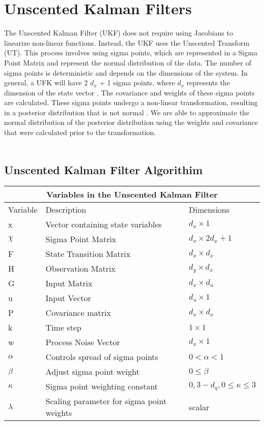 \chapter{Unscented Kalman Filters}
\label{Unscented Kalman Filters}

The Unscented Kalman Filter (UKF) does not require using Jacobians to linearize non-linear functions. Instead, the UKF uses the Unscented Transform (UT). This process involves using sigma points, which are represented in a Sigma Point Matrix and represent the normal distribution of the data. The number of sigma points is deterministic and depends on the dimensions of the system. In general, a UFK will have 2 $d_x$ + 1 sigma points, where $d_x$ represents the dimension of the state vector \cite{inbook, inproceedings, Wan01theunscented}. The covariance and weights of these sigma points are calculated. These sigma points undergo a non-linear transformation, resulting in a posterior distribution that is not normal \cite{inbook, Wan01theunscented} . We are able to approximate the normal distribution of the posterior distribution using the weights and covariance that were calculated prior to the transformation. \\ \\

\section{Unscented Kalman Filter Algorithim}
\begin{center}
    
\centering
\begin{tabular}{ |p{2cm}||p{5cm}|p{2cm}| }
    \hline
    \multicolumn{3}{|c|}{Variables in the Unscented Kalman Filter } \\ 
    \hline
    Variable & Description & Dimensions \\
    \hline
    x & Vector containing state variables & $d_x \times 1 $\\ 
    $\chi $& Sigma Point Matrix &$ d_x \times 2 d_x + 1 $\\
    F & State Transition Matrix  & $d_x \times d_x $  \\ 
    H & Observation Matrix & $d_y \times d_x$\\
    G & Input Matrix & $d_x \times d_u$\\
    u & Input Vector  & $d_u \times 1$\\
    P & Covariance matrix & $d_x \times d_x $  \\
    k & Time step  & $1 \times 1$\\
    w & Process Noise Vector & $d_x \times 1$\\
    $\alpha$ & Controls spread of sigma points & $0 <  \alpha < 1$ \\
    $\beta$ & Adjust sigma point weight & $0 \leq  \beta$ \\
    $\kappa $ & Sigma point weighting constant & $0, 3 - d_q, 0 \leq \kappa \leq 3$ \\
    $\lambda $ & Scaling parameter for sigma point weights & scalar \\
    \hline
\end{tabular}
\end{center}

